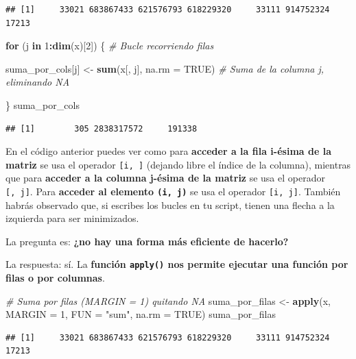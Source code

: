 \documentclass[11pt,]{book}
\newenvironment{Shaded}{\begin{snugshade}}{\end{snugshade}}
\newcommand{\CommentTok}[1]{\textcolor[rgb]{0.37,0.37,0.37}{\textit{#1}}}
\newcommand{\ControlFlowTok}[1]{\textcolor[rgb]{0.27,0.27,0.27}{\textbf{#1}}}
\newcommand{\DataTypeTok}[1]{\textcolor[rgb]{0.27,0.27,0.27}{#1}}
\newcommand{\DecValTok}[1]{\textcolor[rgb]{0.06,0.06,0.06}{#1}}
\newcommand{\KeywordTok}[1]{\textcolor[rgb]{0.27,0.27,0.27}{\textbf{#1}}}
\newcommand{\NormalTok}[1]{#1}
\newcommand{\OperatorTok}[1]{\textcolor[rgb]{0.43,0.43,0.43}{\textbf{#1}}}
\newcommand{\OtherTok}[1]{\textcolor[rgb]{0.37,0.37,0.37}{#1}}
\newcommand{\StringTok}[1]{\textcolor[rgb]{0.5,0.5,0.5}{#1}}
\begin{document}
\begin{verbatim}
## [1]     33021 683867433 621576793 618229320     33111 914752324     17213
\end{verbatim}

\begin{Shaded}
\begin{Highlighting}[]
\ControlFlowTok{for}\NormalTok{ (j }\ControlFlowTok{in} \DecValTok{1}\OperatorTok{:}\KeywordTok{dim}\NormalTok{(x)[}\DecValTok{2}\NormalTok{]) \{ }\CommentTok{# Bucle recorriendo filas}

\NormalTok{  suma_por_cols[j] <-}\StringTok{ }\KeywordTok{sum}\NormalTok{(x[, j], }\DataTypeTok{na.rm =} \OtherTok{TRUE}\NormalTok{) }\CommentTok{# Suma de la columna j, eliminando NA}
    
\NormalTok{\}}
\NormalTok{suma_por_cols}
\end{Highlighting}
\end{Shaded}

\begin{verbatim}
## [1]        305 2838317572     191338
\end{verbatim}

En el código anterior puedes ver como para \textbf{acceder a la fila i-ésima de la matriz} se usa el operador \texttt{{[}i,\ {]}} (dejando libre el índice de la columna), mientras que para \textbf{acceder a la columna j-ésima de la matriz} se usa el operador \texttt{{[},\ j{]}}. Para \textbf{acceder al elemento \texttt{(i,\ j)}} se usa el operador \texttt{{[}i,\ j{]}}. También habrás observado que, si escribes los bucles en tu script, tienen una flecha a la izquierda para ser minimizados.

La pregunta es: \textbf{¿no hay una forma más eficiente de hacerlo?}

La respuesta: sí. La \textbf{función \texttt{apply()} nos permite ejecutar una función por filas o por columnas}.

\begin{Shaded}
\begin{Highlighting}[]
\CommentTok{# Suma por filas (MARGIN = 1) quitando NA}
\NormalTok{suma_por_filas <-}\StringTok{ }\KeywordTok{apply}\NormalTok{(x, }\DataTypeTok{MARGIN =} \DecValTok{1}\NormalTok{, }\DataTypeTok{FUN =} \StringTok{"sum"}\NormalTok{, }\DataTypeTok{na.rm =} \OtherTok{TRUE}\NormalTok{)}
\NormalTok{suma_por_filas }
\end{Highlighting}
\end{Shaded}

\begin{verbatim}
## [1]     33021 683867433 621576793 618229320     33111 914752324     17213
\end{verbatim}
\end{document}
